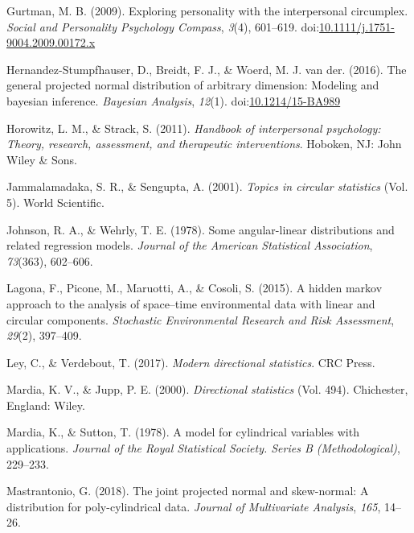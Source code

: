 \documentclass[11pt,]{article}
\begin{document}
\leavevmode\hypertarget{ref-gurtman2009exploring}{}%
Gurtman, M. B. (2009). Exploring personality with the interpersonal
circumplex. \emph{Social and Personality Psychology Compass},
\emph{3}(4), 601--619.
doi:\href{https://doi.org/10.1111/j.1751-9004.2009.00172.x}{10.1111/j.1751-9004.2009.00172.x}

\leavevmode\hypertarget{ref-hernandez2016general}{}%
Hernandez-Stumpfhauser, D., Breidt, F. J., \& Woerd, M. J. van der.
(2016). The general projected normal distribution of arbitrary
dimension: Modeling and bayesian inference. \emph{Bayesian Analysis},
\emph{12}(1).
doi:\href{https://doi.org/10.1214/15-BA989}{10.1214/15-BA989}

\leavevmode\hypertarget{ref-horowitz2010handbook}{}%
Horowitz, L. M., \& Strack, S. (2011). \emph{Handbook of interpersonal
psychology: Theory, research, assessment, and therapeutic
interventions}. Hoboken, NJ: John Wiley \& Sons.

\leavevmode\hypertarget{ref-jammalamadaka2001topics}{}%
Jammalamadaka, S. R., \& Sengupta, A. (2001). \emph{Topics in circular
statistics} (Vol. 5). World Scientific.

\leavevmode\hypertarget{ref-johnson1978some}{}%
Johnson, R. A., \& Wehrly, T. E. (1978). Some angular-linear
distributions and related regression models. \emph{Journal of the
American Statistical Association}, \emph{73}(363), 602--606.

\leavevmode\hypertarget{ref-lagona2015hidden}{}%
Lagona, F., Picone, M., Maruotti, A., \& Cosoli, S. (2015). A hidden
markov approach to the analysis of space--time environmental data with
linear and circular components. \emph{Stochastic Environmental Research
and Risk Assessment}, \emph{29}(2), 397--409.

\leavevmode\hypertarget{ref-ley2017modern}{}%
Ley, C., \& Verdebout, T. (2017). \emph{Modern directional statistics}.
CRC Press.

\leavevmode\hypertarget{ref-mardia2000directional}{}%
Mardia, K. V., \& Jupp, P. E. (2000). \emph{Directional statistics}
(Vol. 494). Chichester, England: Wiley.

\leavevmode\hypertarget{ref-mardia1978model}{}%
Mardia, K., \& Sutton, T. (1978). A model for cylindrical variables with
applications. \emph{Journal of the Royal Statistical Society. Series B
(Methodological)}, 229--233.

\leavevmode\hypertarget{ref-mastrantonio2018joint}{}%
Mastrantonio, G. (2018). The joint projected normal and skew-normal: A
distribution for poly-cylindrical data. \emph{Journal of Multivariate
Analysis}, \emph{165}, 14--26.
\end{document}
